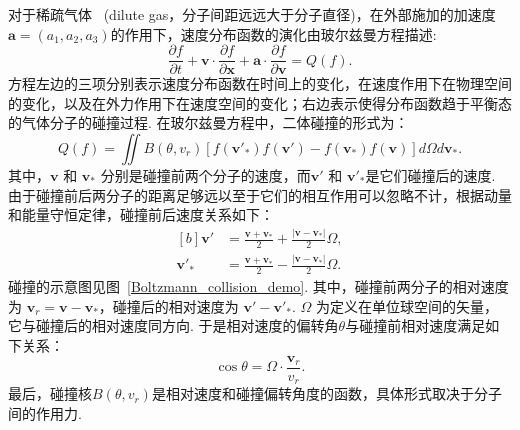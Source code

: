 对于稀疏气体 ~(dilute gas，分子间距远远大于分子直径)，在外部施加的加速度$\bm{a}=(a_1,a_2,a_3)$的作用下，速度分布函数的演化由玻尔兹曼方程描述:
\begin{equation}\label{Boltzmann}
\frac{\partial f}{\partial t}+\bm{v}\cdot\frac{\partial f}{\partial
	\bm{x}}+\bm{a}\cdot\frac{\partial f}{\partial \bm{v}}={Q(f)}.
\end{equation}
方程左边的三项分别表示速度分布函数在时间上的变化，在速度作用下在物理空间的变化，以及在外力作用下在速度空间的变化；右边表示使得分布函数趋于平衡态的气体分子的碰撞过程. 在玻尔兹曼方程中，二体碰撞的形式为：
\begin{equation}\label{chapter1_collision}
Q(f)=\iint{}B(\theta,{v}_r) 
[f(\bm{v}'_*)f(\bm{v}')-f(\bm{v}_*)f(\bm{v})]d{\Omega}d\bm{v}_*.
\end{equation}
其中，$\bm{v}$ 和 $\bm{v}_\ast$ 分别是碰撞前两个分子的速度，而$\bm{v}'$ 和 $\bm{v}'_\ast$是它们碰撞后的速度.  由于碰撞前后两分子的距离足够远以至于它们的相互作用可以忽略不计，根据动量和能量守恒定律，碰撞前后速度关系如下：
\begin{equation}\label{collision_velocity}
\begin{aligned}[b]
\bm{v}'&=\frac{\bm{v}+\bm{v}_\ast}{2}+\frac{|\bm{v}-\bm{v}_\ast|}{2}\Omega,\\%
\bm{v}'_\ast&=\frac{\bm{v}+\bm{v}_\ast}{2}-\frac{|\bm{v}-\bm{v}_\ast|}{2}\Omega.%
\end{aligned}
\end{equation}
碰撞的示意图见图~\ref{Boltzmann_collision_demo}. 其中，碰撞前两分子的相对速度为 $\bm{v}_r=\bm{v}-\bm{v}_\ast$，碰撞后的相对速度为 $\bm{v}'-\bm{v}'_\ast$. $\Omega$ 为定义在单位球空间的矢量，它与碰撞后的相对速度同方向. 于是相对速度的偏转角$\theta$与碰撞前相对速度满足如下关系：
\begin{equation}
\cos\theta=\Omega\cdot\frac{\bm{v}_r}{{v}_r}.
\end{equation}
最后，碰撞核$B(\theta,v_r) $是相对速度和碰撞偏转角度的函数，具体形式取决于分子间的作用力. 


